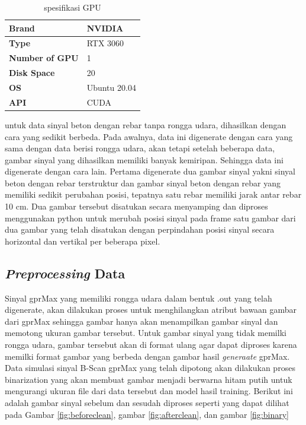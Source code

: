 \begin{table}[H]
  \centering
  \begin{tabular}{|>{\bfseries}l|l|}
    \hline
    \textbf{Brand}         & NVIDIA       \\ \hline
    \textbf{Type}          & RTX 3060     \\ \hline
    \textbf{Number of GPU} & 1            \\ \hline
    \textbf{Disk Space}    & 20           \\ \hline
    \textbf{OS}            & Ubuntu 20.04 \\ \hline
    \textbf{API}           & CUDA         \\ \hline
  \end{tabular}
  \caption{spesifikasi GPU}
  \label{tab:gpu}
\end{table}

untuk data sinyal beton dengan rebar tanpa rongga udara, dihasilkan dengan cara yang sedikit berbeda. Pada awalnya, data ini digenerate dengan cara yang sama dengan data berisi rongga udara, akan tetapi setelah beberapa data, gambar sinyal yang dihasilkan memiliki banyak kemiripan. Sehingga data ini digenerate dengan cara lain. Pertama digenerate dua gambar sinyal yakni sinyal beton dengan rebar terstruktur dan gambar sinyal beton dengan rebar yang memiliki sedikit perubahan posisi, tepatnya satu rebar memiliki jarak antar rebar 10 cm. Dua gambar tersebut disatukan secara menyamping dan diproses menggunakan python untuk merubah posisi sinyal pada frame satu gambar dari dua gambar yang telah disatukan dengan perpindahan posisi sinyal secara horizontal dan vertikal per beberapa pixel. 

\subsection{\emph{Preprocessing} Data}
Sinyal gprMax yang memiliki rongga udara dalam bentuk .out yang telah digenerate, akan dilakukan proses untuk menghilangkan atribut bawaan gambar dari gprMax sehingga gambar hanya akan menampilkan gambar sinyal dan memotong ukuran gambar tersebut. Untuk gambar sinyal yang tidak memilki rongga udara, gambar tersebut akan di format ulang agar dapat diproses karena memilki format gambar yang berbeda dengan gambar hasil \emph{generaate} gprMax. Data simulasi sinyal B-Scan gprMax yang telah dipotong akan dilakukan proses binarization yang akan membuat gambar menjadi berwarna hitam putih untuk mengurangi ukuran file dari data tersebut dan model hasil training. Berikut ini adalah gambar sinyal sebelum dan sesudah diproses seperti yang dapat dilihat pada Gambar \ref{fig:beforeclean}, gambar \ref{fig:afterclean}, dan gambar \ref{fig:binary}

